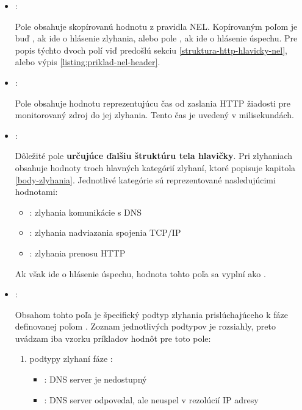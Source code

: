 \begin{itemize}
    \item {}:

    Pole obsahuje skopírovanú hodnotu z pravidla NEL. Kopírovaným poľom je buď , ak ide o hlásenie zlyhania, alebo pole , ak ide o hlásenie úspechu.
    Pre popis týchto dvoch polí viď predošlú sekciu \ref{struktura-http-hlavicky-nel}, alebo výpis \ref{listing:priklad-nel-header}.
    
    \item {}:

    Pole obsahuje hodnotu reprezentujúcu čas od zaslania HTTP žiadosti pre monitorovaný zdroj do jej zlyhania.
    Tento čas je uvedený v milisekundách.
    
    \item {}:

    Dôležité pole \textbf{určujúce ďalšiu štruktúru tela hlavičky}.
    Pri zlyhaniach obsahuje hodnoty troch hlavných kategórií zlyhaní, ktoré popisuje kapitola \ref{body-zlyhania}.
    Jednotlivé kategórie sú reprezentované nasledujúcimi hodnotami: 
    \begin{itemize}
        \item {}: zlyhania komunikácie s DNS
        \item {}: zlyhania nadviazania spojenia TCP/IP
        \item {}: zlyhania prenosu HTTP
    \end{itemize}

    Ak však ide o hlásenie úspechu, hodnota tohto poľa sa vyplní ako .

    \pagebreak
    
    \item {}:

    Obsahom tohto poľa je špecifický podtyp zlyhania prislúchajúceho k fáze definovanej poľom .
    Zoznam jednotlivých podtypov je rozsiahly, preto uvádzam iba vzorku príkladov hodnôt pre toto pole:
    \begin{enumerate}
        \item podtypy zlyhaní fáze :
        \begin{itemize}
            \item {}: DNS server je nedostupný
            \item {}: DNS server odpovedal, ale neuspel v rezolúcií IP adresy
        \end{itemize}
        

\end{enumerate}
\end{itemize}
